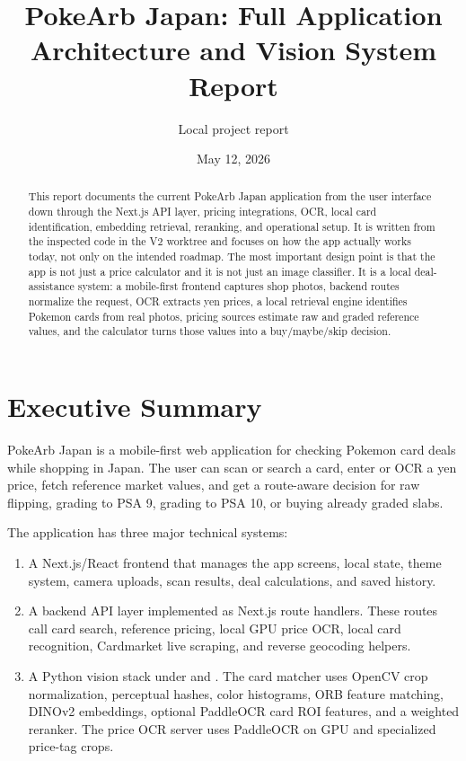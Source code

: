 \documentclass[11pt,a4paper]{article}
\title{PokeArb Japan: Full Application Architecture and Vision System Report}
\author{Local project report}
\date{May 12, 2026}
\begin{document}
\maketitle

\begin{abstract}
This report documents the current PokeArb Japan application from the user interface down through the Next.js API layer, pricing integrations, OCR, local card identification, embedding retrieval, reranking, and operational setup. It is written from the inspected code in the V2 worktree and focuses on how the app actually works today, not only on the intended roadmap. The most important design point is that the app is not just a price calculator and it is not just an image classifier. It is a local deal-assistance system: a mobile-first frontend captures shop photos, backend routes normalize the request, OCR extracts yen prices, a local retrieval engine identifies Pokemon cards from real photos, pricing sources estimate raw and graded reference values, and the calculator turns those values into a buy/maybe/skip decision.
\end{abstract}

\tableofcontents
\newpage

\section{Executive Summary}

PokeArb Japan is a mobile-first web application for checking Pokemon card deals while shopping in Japan. The user can scan or search a card, enter or OCR a yen price, fetch reference market values, and get a route-aware decision for raw flipping, grading to PSA 9, grading to PSA 10, or buying already graded slabs.

The application has three major technical systems:

\begin{enumerate}
  \item A Next.js/React frontend that manages the app screens, local state, theme system, camera uploads, scan results, deal calculations, and saved history.
  \item A backend API layer implemented as Next.js route handlers. These routes call card search, reference pricing, local GPU price OCR, local card recognition, Cardmarket live scraping, and reverse geocoding helpers.
  \item A Python vision stack under  and . The card matcher uses OpenCV crop normalization, perceptual hashes, color histograms, ORB feature matching, DINOv2 embeddings, optional PaddleOCR card ROI features, and a weighted reranker. The price OCR server uses PaddleOCR on GPU and specialized price-tag crops.
\end{enumerate}
\end{document}
